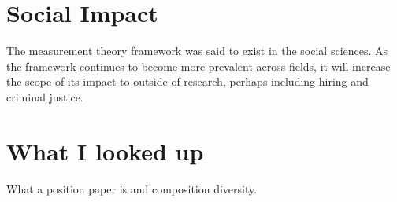 \documentclass[12pt, letterpaper]{article}
\begin{document}
\section{Social Impact}
\label{sec:impact}
The measurement theory framework was said to exist in the social sciences. As the framework continues to become more prevalent across fields, it will increase the scope of its impact to outside of research, perhaps including hiring and criminal justice.

\section{What I looked up}
\label{sec:looked up}
What a position paper is and composition diversity.


\end{document}
